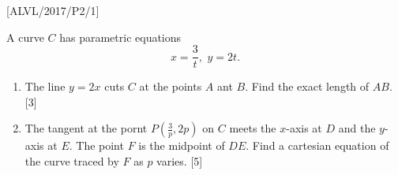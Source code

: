 \item {[}ALVL/2017/P2/1{]}

A curve $C$ has parametric equations 
\[
x=\frac{3}{t},\,\,y=2t.
\]

\begin{enumerate}
\item The line $y=2x$ cuts $C$ at the points $A$ ant $B$. Find the exact
length of $AB$. \hfill{}{[}3{]}
\item The tangent at the pornt $P\left(\frac{3}{p},2p\right)$ on $C$ meets
the $x$-axis at $D$ and the $y$-axis at $E$. The point $F$ is
the midpoint of $DE$. Find a cartesian equation of the curve traced
by $F$ as $p$ varies.\hfill{} {[}5{]}
\end{enumerate}
